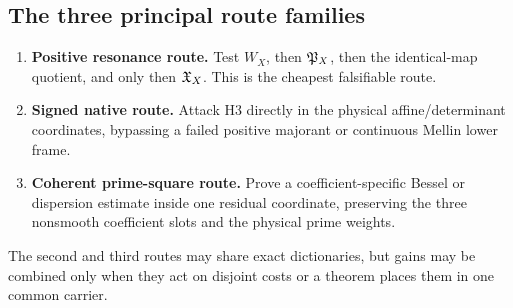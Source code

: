 \subsection{The three principal route families}

\begin{enumerate}[leftmargin=2em]
\item \textbf{Positive resonance route.}  Test \(W_X\), then \(\mathfrak P_X\),
  then the identical-map quotient, and only then \(\mathfrak X_X\).  This is the
  cheapest falsifiable route.
\item \textbf{Signed native route.}  Attack H3 directly in the
  physical affine/determinant coordinates, bypassing a failed
  positive majorant or continuous Mellin lower frame.
\item \textbf{Coherent prime-square route.}  Prove a
  coefficient-specific Bessel or dispersion estimate inside one
  residual coordinate, preserving the three nonsmooth coefficient
  slots and the physical prime weights.
\end{enumerate}
The second and third routes may share exact dictionaries, but gains
may be combined only when they act on disjoint costs or a theorem
places them in one common carrier.
